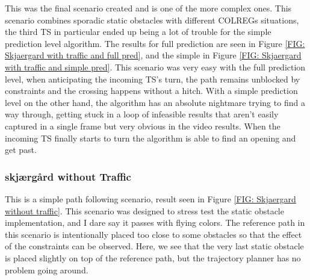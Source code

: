 This was the final scenario created and is one of the more complex ones. This scenario combines sporadic static obstacles with different COLREGs situations, the third
TS in particular ended up being a lot of trouble for the simple prediction level algorithm. The results for full prediction are seen in Figure \ref{FIG: Skjaergard with traffic and full pred},
and the simple in Figure \ref{FIG: Skjaergard with traffic and simple pred}. This scenario was very easy with the full prediction level, when anticipating the incoming TS's turn, the path
remains unblocked by constraints and the crossing happens without a hitch. With a simple prediction level on the other hand, the algorithm has an absolute nightmare trying to find a way through,
getting stuck in a loop of infeasible results that aren't easily captured in a single frame but very obvious in the video results. When the incoming TS finally starts to turn the algorithm
is able to find an opening and get past.


\subsubsection{skjærgård without Traffic}
This is a simple path following scenario, result seen in Figure \ref{FIG: Skjaergard without traffic}. This scenario was designed to stress
test the static obstacle implementation, and I dare say it passes with flying colors. The reference path in this scenario is intentionally placed
too close to some obstacles so that the effect of the constraints can be observed. Here, we see that the very last static obstacle is placed
slightly on top of the reference path, but the trajectory planner has no problem going around.

